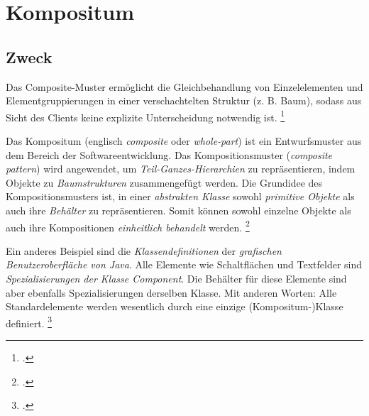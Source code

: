 \documentclass{lehramt-informatik}
\begin{document}

\chapter{Kompositum}

\begin{quellen}
\item \cite{wiki:kompositum}
\item \cite[Seite 139-147]{gof}
\item \cite[Seite 102-104]{eilebrecht}
\item \cite[Kapitel 14, Seite 173]{siebler}
\end{quellen}

\section{Zweck}

Das Composite-Muster ermöglicht die Gleichbehandlung von Einzelelementen
und Elementgruppierungen in einer verschachtelten Struktur (z. B. Baum),
sodass aus Sicht des Clients keine explizite Unterscheidung notwendig
ist.
\footcite[Seite 102]{eilebrecht}

%

Das Kompositum (englisch \emph{composite} oder \emph{whole-part}) ist
ein Entwurfsmuster aus dem Bereich der Softwareentwicklung. Das
Kompositionsmuster (\emph{composite pattern}) wird angewendet, um
\emph{Teil-Ganzes-Hierarchien} zu repräsentieren, indem Objekte zu
\emph{Baumstrukturen} zusammengefügt werden. Die Grundidee des
Kompositionsmusters ist, in einer \emph{abstrakten Klasse} sowohl
\emph{primitive Objekte} als auch ihre \emph{Behälter} zu
repräsentieren. Somit können sowohl einzelne Objekte als auch ihre
Kompositionen \emph{einheitlich behandelt} werden.
\footcite{aud:fs:4}

Ein anderes Beispiel sind die \emph{Klassendefinitionen} der
\emph{grafischen Benutzeroberfläche von Java}. Alle Elemente wie
Schaltflächen und Textfelder sind \emph{Spezialisierungen der Klasse
Component}. Die Behälter für diese Elemente sind aber ebenfalls
Spezialisierungen derselben Klasse. Mit anderen Worten: Alle
Standardelemente werden wesentlich durch eine einzige
(Kompositum-)Klasse definiert.
\footcite{wiki:kompositum}
\end{document}
